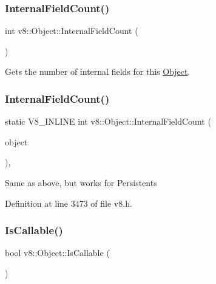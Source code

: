\subsubsection{\texorpdfstring{Internal\+Field\+Count()}{InternalFieldCount()}\hspace{0.1cm}{\footnotesize\ttfamily [1/2]}}
{\footnotesize\ttfamily int v8\+::\+Object\+::\+Internal\+Field\+Count (\begin{DoxyParamCaption}{ }\end{DoxyParamCaption})}

Gets the number of internal fields for this \mbox{\hyperlink{classv8_1_1Object}{Object}}. \mbox{\label{classv8_1_1Object_a324a71142f621a32bfe5738648718370}} 
\subsubsection{\texorpdfstring{Internal\+Field\+Count()}{InternalFieldCount()}\hspace{0.1cm}{\footnotesize\ttfamily [2/2]}}
{\footnotesize\ttfamily static V8\+\_\+\+I\+N\+L\+I\+NE int v8\+::\+Object\+::\+Internal\+Field\+Count (\begin{DoxyParamCaption}\item[{const \mbox{\hyperlink{classv8_1_1PersistentBase}{Persistent\+Base}}$<$ \mbox{\hyperlink{classv8_1_1Object}{Object}} $>$ \&}]{object }\end{DoxyParamCaption})\hspace{0.3cm}{\ttfamily [inline]}, {\ttfamily [static]}}

Same as above, but works for Persistents 

Definition at line 3473 of file v8.\+h.

\mbox{\label{classv8_1_1Object_a23c2c1f23b50fab4a02e2f819641b865}} 
\subsubsection{\texorpdfstring{Is\+Callable()}{IsCallable()}}
{\footnotesize\ttfamily bool v8\+::\+Object\+::\+Is\+Callable (\begin{DoxyParamCaption}{ }\end{DoxyParamCaption})}

